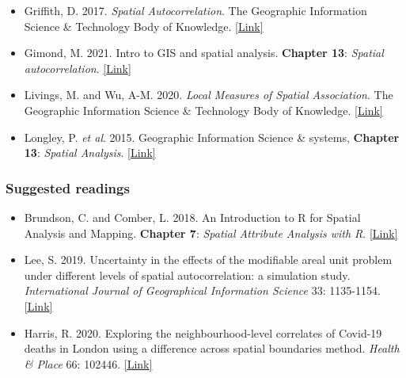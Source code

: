 \documentclass[
]{book}
\providecommand{\tightlist}{%
  \setlength{\itemsep}{0pt}\setlength{\parskip}{0pt}}
\begin{document}
\begin{itemize}
\tightlist
\item
  Griffith, D. 2017. \emph{Spatial Autocorrelation}. The Geographic Information Science \& Technology Body of Knowledge. \href{https://doi.org/10.22224/gistbok/2020.3.10}{{[}Link{]}}
\item
  Gimond, M. 2021. Intro to GIS and spatial analysis. \textbf{Chapter 13}: \emph{Spatial autocorrelation}. \href{https://mgimond.github.io/Spatial/spatial-autocorrelation.html}{{[}Link{]}}
\item
  Livings, M. and Wu, A-M. 2020. \emph{Local Measures of Spatial Association}. The Geographic Information Science \& Technology Body of Knowledge. \href{https://doi.org/10.22224/gistbok/2020.3.10}{{[}Link{]}}
\item
  Longley, P. \emph{et al}. 2015. Geographic Information Science \& systems, \textbf{Chapter 13}: \emph{Spatial Analysis}. \href{https://rl.talis.com/3/ucl/items/fd38ec78-2bea-4165-aab3-0e9d9093db8e.html?lang=en-gb\&login=1}{{[}Link{]}}
\end{itemize}

\hypertarget{suggested-readings-6}{%
\subsubsection*{Suggested readings}\label{suggested-readings-6}}

\begin{itemize}
\tightlist
\item
  Brundson, C. and Comber, L. 2018. An Introduction to R for Spatial Analysis and Mapping. \textbf{Chapter 7}: \emph{Spatial Attribute Analysis with R}. \href{https://ucl.userservices.exlibrisgroup.com/view/action/uresolver.do?operation=resolveService\&package_service_id=10347667960004761\&institutionId=4761\&customerId=4760}{{[}Link{]}}
\item
  Lee, S. 2019. Uncertainty in the effects of the modifiable areal unit problem under different levels of spatial autocorrelation: a simulation study. \emph{International Journal of Geographical Information Science} 33: 1135-1154. \href{https://doi.org/10.1080/13658816.2018.1542699}{{[}Link{]}}
\item
  Harris, R. 2020. Exploring the neighbourhood-level correlates of Covid-19 deaths in London using a difference across spatial boundaries method. \emph{Health \& Place} 66: 102446. \href{https://doi.org/10.1016/j.healthplace.2020.102446}{{[}Link{]}}
\end{itemize}
\end{document}

